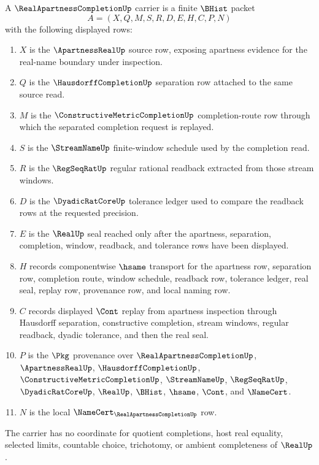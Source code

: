 \begin{definition}
\label{def:real-apartness-completion-carrier}
A $\RealApartnessCompletionUp$ carrier is a finite $\BHist$ packet
$$
A=(X,Q,M,S,R,D,E,H,C,P,N)
$$
with the following displayed rows:
\begin{enumerate}
\item $X$ is the $\ApartnessRealUp$ source row, exposing apartness evidence for the real-name boundary under inspection.
\item $Q$ is the $\HausdorffCompletionUp$ separation row attached to the same source read.
\item $M$ is the $\ConstructiveMetricCompletionUp$ completion-route row through which the separated completion request is replayed.
\item $S$ is the $\StreamNameUp$ finite-window schedule used by the completion read.
\item $R$ is the $\RegSeqRatUp$ regular rational readback extracted from those stream windows.
\item $D$ is the $\DyadicRatCoreUp$ tolerance ledger used to compare the readback rows at the requested precision.
\item $E$ is the $\RealUp$ seal reached only after the apartness, separation, completion, window, readback, and tolerance rows have been displayed.
\item $H$ records componentwise $\hsame$ transport for the apartness row, separation row, completion route, window schedule, readback row, tolerance ledger, real seal, replay row, provenance row, and local naming row.
\item $C$ records displayed $\Cont$ replay from apartness inspection through Hausdorff separation, constructive completion, stream windows, regular readback, dyadic tolerance, and then the real seal.
\item $P$ is the $\Pkg$ provenance over $\RealApartnessCompletionUp$, $\ApartnessRealUp$, $\HausdorffCompletionUp$, $\ConstructiveMetricCompletionUp$, $\StreamNameUp$, $\RegSeqRatUp$, $\DyadicRatCoreUp$, $\RealUp$, $\BHist$, $\hsame$, $\Cont$, and $\NameCert$.
\item $N$ is the local $\NameCert_{\RealApartnessCompletionUp}$ row.
\end{enumerate}
The carrier has no coordinate for quotient completions, host real equality, selected limits, countable choice, trichotomy, or ambient completeness of $\RealUp$.
\end{definition}

